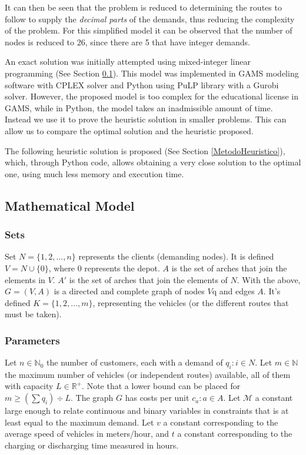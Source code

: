\documentclass{amsart}
\begin{document}
    It can then be seen that the problem is reduced to determining the routes to follow to supply the \textit{decimal parts} of the demands, thus reducing the complexity of the problem. For this simplified model it can be observed that the number of nodes is reduced to 26, since there are 5 that have integer demands.

    An exact solution was initially attempted using mixed-integer linear programming (See Section \ref{ModeloMatematico}). This model was implemented in GAMS modeling software with CPLEX solver and Python using PuLP library with a Gurobi solver. However, the proposed model is too complex for the educational license in GAMS, while in Python, the model takes an inadmissible amount of time. Instead we use it to prove the heuristic solution in smaller problems. This can allow us to compare the optimal solution and the heuristic proposed.

        The following heuristic solution is proposed (See Section \ref{MetodoHeuristico}), which, through Python code, allows obtaining a very close solution to the optimal one, using much less memory and execution time.
        
        

    \subsection{Mathematical Model}\label{ModeloMatematico}
        \subsubsection{Sets} 
        
        
        Set $N=\{1, 2, ... , n\}$ represents the clients (demanding nodes). It is defined $V=N \cup \{0\}$, where $0$ represents the depot. $A$ is the set of arches that join the elements in $V$. $A'$ is the set of arches that join the elements of $N$. With the above, $G=(V, A)$ is a directed and complete graph of nodes $V$q and edges $A$. It's defined $K = \{1, 2, ..., m\}$, representing the vehicles (or the different routes that must be taken).
        

        \subsubsection{Parameters}
        
        
        Let $n \in \mathbb{N}_0$ the number of customers, each with a demand of $q_i : i \in N$. Let $m \in \mathbb{N}$ the maximum number of vehicles (or independent routes) available, all of them with capacity $L \in \mathbb{R}^+$. Note that a lower bound can be placed for $m \geq (\sum q_i) \div L$. The graph $G$ has costs per unit $c_{a} : a \in A$. Let $\mathcal{M}$ a constant large enough to relate continuous and binary variables in constraints that is at least equal to the maximum demand. Let $v$ a constant corresponding to the average speed of vehicles in meters/hour, and $t$ a constant corresponding to the charging or discharging time measured in hours.
\end{document}
